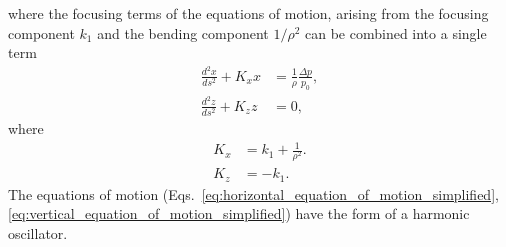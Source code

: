 \documentclass[../main.tex]{subfiles}
\begin{document}
where the focusing terms of the equations of motion, arising from the focusing component $k_{1}$ and the bending component $1/\rho^{2}$ can be combined into a single term
\begin{align}
\frac{d^{2}x}{ds^{2}} + K_{x}x &= \frac{1}{\rho}\frac{\Delta p}{p_{0}},
\label{eq:horizontal_equation_of_motion_simplified} \\
\frac{d^{2}z}{ds^{2}} + K_{z}z &= 0,
\label{eq:vertical_equation_of_motion_simplified}
\end{align}
where
\begin{align}
K_{x} &= k_{1} + \frac{1}{\rho^{2}}. \nonumber\\
K_{z} &= -k_{1}.
\label{eq:focusing_equation_of_motion}    
\end{align}
The equations of motion (Eqs.~\ref{eq:horizontal_equation_of_motion_simplified}, \ref{eq:vertical_equation_of_motion_simplified}) have the form of a harmonic oscillator.
\end{document}
